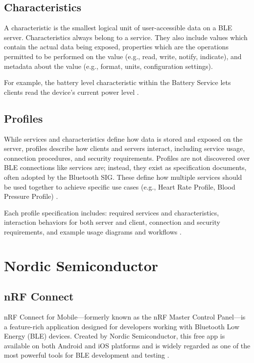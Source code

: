 \subsection{Characteristics}

A characteristic is the smallest logical unit of user-accessible data on a BLE server. Characteristics always belong to a service. They also include values which contain the actual data being exposed, properties which are the operations permitted to be performed on the value (e.g., read, write, notify, indicate), and metadata about the value (e.g., format, units, configuration settings).

For example, the battery level characteristic within the Battery Service lets clients read the device's current power level \cite{introtoble}.

\subsection{Profiles}

While services and characteristics define how data is stored and exposed on the server, profiles describe how clients and servers interact, including service usage, connection procedures, and security requirements. Profiles are not discovered over BLE connections like services are; instead, they exist as specification documents, often adopted by the Bluetooth SIG. These define how multiple services should be used together to achieve specific use cases (e.g., Heart Rate Profile, Blood Pressure Profile) \cite{introtoble}.

Each profile specification includes: required services and characteristics, interaction behaviors for both server and client, connection and security requirements, and example usage diagrams and workflows \cite{introtoble}.


\section{Nordic Semiconductor}

\subsection{nRF Connect}

nRF Connect for Mobile—formerly known as the nRF Master Control Panel—is a feature-rich application designed for developers working with Bluetooth Low Energy (BLE) devices. Created by Nordic Semiconductor, this free app is available on both Android and iOS platforms and is widely regarded as one of the most powerful tools for BLE development and testing \cite{buildingBLEsystems}.

